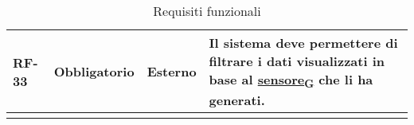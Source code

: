 \begin{longtable}{|>{\centering\arraybackslash}m{}|>{\centering\arraybackslash}m{}|>{\centering\arraybackslash}m{}|>{\centering\arraybackslash}m{}|}
	RF-33           & Obbligatorio        & Esterno                                                                                                           & Il sistema deve permettere di filtrare i dati visualizzati in base al \href{https://7last.github.io/docs/rtb/documentazione-interna/glossario\#sensore}{sensore\textsubscript{G}} che li ha generati.                                                                                                                                                                                                                                                                                                \\\hline
	\caption{Requisiti funzionali}
	\label{table:1}
\end{longtable}

